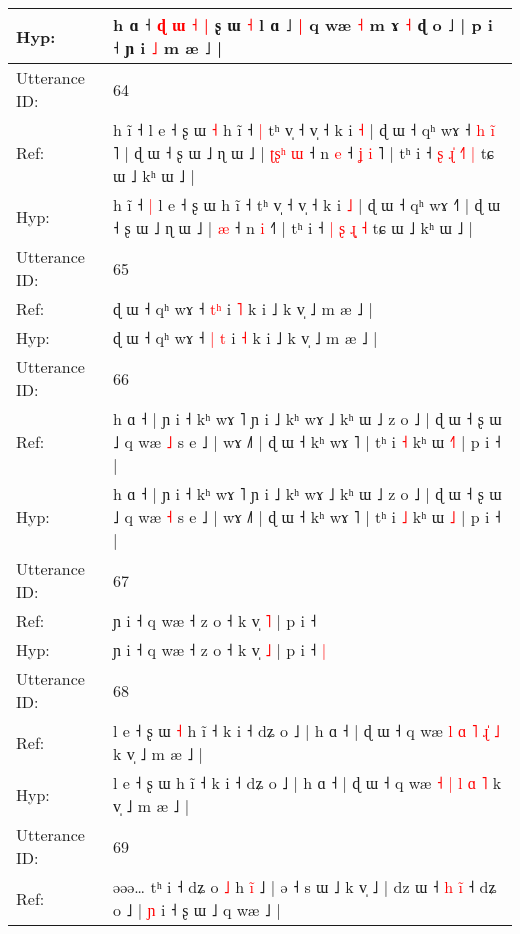 \documentclass[10pt]{article}
\DeclareRobustCommand{\hl}[1]{{\textcolor{red}{#1}}}
\begin{document}
\begin{longtable}{ll}
 \\
Hyp: & h ɑ ˧ \hl{ɖ} \hl{ɯ} \hl{˧} \hl{|} ʂ ɯ \hl{˧} l ɑ ˩\hl{ }\hl{|} q wæ \hl{˧} m ɤ \hl{˧} ɖ o ˩ | p i ˧ ɲ i \hl{˩} m æ ˩ |
 \\
\midrule
Utterance ID: & 64 \\
Ref: & h ĩ ˧\hl{}\hl{} l e ˧ ʂ ɯ\hl{ }\hl{˧} h ĩ ˧\hl{ }\hl{|} tʰ v̩ ˧ v̩ ˧ k i \hl{˧} | ɖ ɯ ˧ qʰ wɤ ˧\hl{ }\hl{h}\hl{ }\hl{i}\hl{̃}\hl{ }˥ | ɖ ɯ ˧ ʂ ɯ ˩ ɳ ɯ ˩ |\hl{ }\hl{ʈ}\hl{ʂ}\hl{ʰ} \hl{ɯ} ˧ n \hl{e} ˧\hl{ }\hl{ʝ}\hl{ }\hl{i}\hl{ }˥ | tʰ i ˧ \hl{ʂ} \hl{ɻ}\hl{̍} \hl{˧}\hl{˥} \hl{|} tɕ ɯ ˩ kʰ ɯ ˩ |
 \\
Hyp: & h ĩ ˧\hl{ }\hl{|} l e ˧ ʂ ɯ\hl{}\hl{} h ĩ ˧\hl{}\hl{} tʰ v̩ ˧ v̩ ˧ k i \hl{˩} | ɖ ɯ ˧ qʰ wɤ ˧\hl{}\hl{}\hl{}\hl{}\hl{}\hl{}˥ | ɖ ɯ ˧ ʂ ɯ ˩ ɳ ɯ ˩ |\hl{}\hl{}\hl{}\hl{} \hl{æ} ˧ n \hl{i} ˧\hl{}\hl{}\hl{}\hl{}\hl{}˥ | tʰ i ˧ \hl{|} \hl{}\hl{ʂ} \hl{ɻ}\hl{̩} \hl{˧} tɕ ɯ ˩ kʰ ɯ ˩ |
 \\
\midrule
Utterance ID: & 65 \\
Ref: & ɖ ɯ ˧ qʰ wɤ ˧ \hl{}\hl{t}\hl{ʰ} i \hl{˥} k i ˩ k v̩ ˩ m æ ˩ |
 \\
Hyp: & ɖ ɯ ˧ qʰ wɤ ˧ \hl{|}\hl{ }\hl{t} i \hl{˧} k i ˩ k v̩ ˩ m æ ˩ |
 \\
\midrule
Utterance ID: & 66 \\
Ref: & h ɑ ˧ | ɲ i ˧ kʰ wɤ ˥ ɲ i ˩ kʰ wɤ ˩ kʰ ɯ ˩ z o ˩ | ɖ ɯ ˧ ʂ ɯ ˩ q wæ \hl{˩} s e ˩ | wɤ ˩˥ | ɖ ɯ ˧ kʰ wɤ ˥ | tʰ i \hl{˧} kʰ ɯ \hl{˧}\hl{˥} | p i ˧ |
 \\
Hyp: & h ɑ ˧ | ɲ i ˧ kʰ wɤ ˥ ɲ i ˩ kʰ wɤ ˩ kʰ ɯ ˩ z o ˩ | ɖ ɯ ˧ ʂ ɯ ˩ q wæ \hl{˧} s e ˩ | wɤ ˩˥ | ɖ ɯ ˧ kʰ wɤ ˥ | tʰ i \hl{˩} kʰ ɯ \hl{}\hl{˩} | p i ˧ |
 \\
\midrule
Utterance ID: & 67 \\
Ref: & ɲ i ˧ q wæ ˧ z o ˧ k v̩ \hl{˥} | p i ˧\hl{}\hl{}
 \\
Hyp: & ɲ i ˧ q wæ ˧ z o ˧ k v̩ \hl{˩} | p i ˧\hl{ }\hl{|}
 \\
\midrule
Utterance ID: & 68 \\
Ref: & l e ˧ ʂ ɯ\hl{ }\hl{˧} h ĩ ˧ k i ˧ dʑ o ˩ | h ɑ ˧ | ɖ ɯ ˧ q wæ \hl{l} \hl{ɑ} \hl{˥} \hl{ɻ}\hl{̍} \hl{˩} k v̩ ˩ m æ ˩ |
 \\
Hyp: & l e ˧ ʂ ɯ\hl{}\hl{} h ĩ ˧ k i ˧ dʑ o ˩ | h ɑ ˧ | ɖ ɯ ˧ q wæ \hl{˧} \hl{|} \hl{l} \hl{}\hl{ɑ} \hl{˥} k v̩ ˩ m æ ˩ |
 \\
\midrule
Utterance ID: & 69 \\
Ref: & əəə… tʰ i ˧ dʑ o\hl{ }\hl{˩} h\hl{ }\hl{i}\hl{̃} ˩ | ə ˧ s ɯ ˩ k v̩ ˩ | dz ɯ ˧ \hl{h} \hl{i}\hl{̃} ˧ dʑ o ˩ | \hl{ɲ} i ˧\hl{}\hl{} \hl{}ʂ\hl{} ɯ ˩ q wæ ˩ |

\end{longtable}
\end{document}
